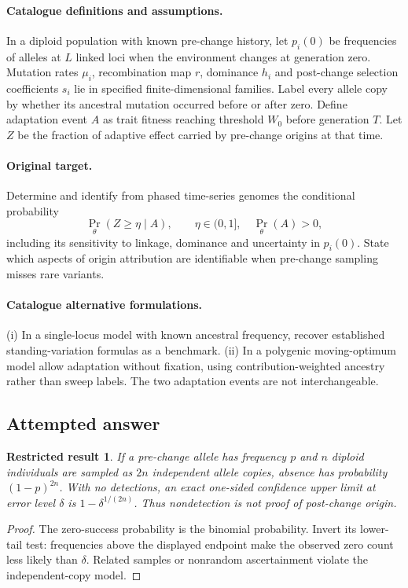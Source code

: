 \documentclass[11pt]{article}
\newtheorem{attemptresult}{Restricted result}[section]
\begin{document}
\paragraph{Catalogue definitions and assumptions.}
In a diploid population with known pre-change history, let $p_i(0)$ be frequencies of alleles at $L$ linked loci when the environment changes at generation zero. Mutation rates $\mu_i$, recombination map $r$, dominance $h_i$ and post-change selection coefficients $s_i$ lie in specified finite-dimensional families. Label every allele copy by whether its ancestral mutation occurred before or after zero. Define adaptation event $A$ as trait fitness reaching threshold $W_0$ before generation $T$. Let $Z$ be the fraction of adaptive effect carried by pre-change origins at that time.
\paragraph{Original target.}
Determine and identify from phased time-series genomes the conditional probability
\[
 \Pr_\theta(Z\ge\eta\mid A),\qquad
 \eta\in(0,1],\quad\Pr_\theta(A)>0,
\]
including its sensitivity to linkage, dominance and uncertainty in $p_i(0)$. State which aspects of origin attribution are identifiable when pre-change sampling misses rare variants.
\paragraph{Catalogue alternative formulations.}
(i) In a single-locus model with known ancestral frequency, recover established standing-variation formulas as a benchmark. (ii) In a polygenic moving-optimum model allow adaptation without fixation, using contribution-weighted ancestry rather than sweep labels. The two adaptation events are not interchangeable.
\subsection{Attempted answer}
\begin{attemptresult}
If a pre-change allele has frequency $p$ and $n$ diploid individuals are sampled as $2n$ independent allele copies, absence has probability $(1-p)^{2n}$. With no detections, an exact one-sided confidence upper limit at error level $\delta$ is $1-\delta^{1/(2n)}$. Thus nondetection is not proof of post-change origin.
\end{attemptresult}
\begin{proof}
The zero-success probability is the binomial probability. Invert its lower-tail test: frequencies above the displayed endpoint make the observed zero count less likely than $\delta$. Related samples or nonrandom ascertainment violate the independent-copy model.
\end{proof}
\end{document}
